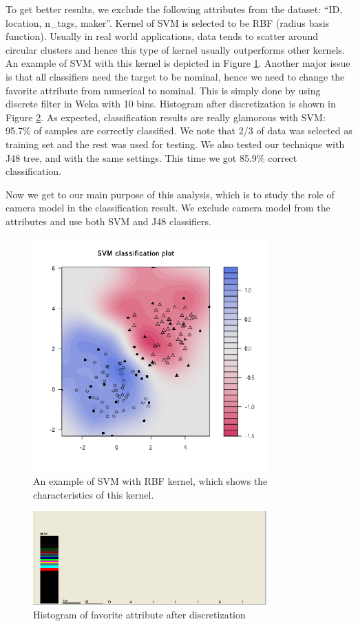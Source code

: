 \documentclass[letter,12pt]{article}
\begin{document}
To get better results, we exclude the following attributes from the
dataset: {}``ID, location, n\_tags, maker''. Kernel of SVM is selected
to be RBF (radius basis function). Usually in real world applications,
data tends to scatter around circular clusters and hence this type
of kernel usually outperforms other kernels. An example of SVM with
this kernel is depicted in Figure \ref{Flo:Rbf}. Another major issue
is that all classifiers need the target to be nominal, hence we need
to change the favorite attribute from numerical to nominal. This
is simply done by using discrete filter in Weka with 10 bins. Histogram
after discretization is shown in Figure \ref{Flo:disc}. As expected,
classification results are really glamorous with SVM: 95.7\% of samples
are correctly classified. We note that 2/3 of data was selected as
training set and the rest was used for testing. We also tested our
technique with J48 tree, and with the same settings. This time we
got 85.9\% correct classification.

Now we get to our main purpose of this analysis, which is to study
the role of camera model in the classification result. We exclude
camera model from the attributes and use both SVM and J48 classifiers.

%
\begin{figure}
\centering
\includegraphics[width=0.8\textwidth]{svm_rbf.png}
\caption{An example of SVM with RBF kernel, which shows the characteristics
of this kernel.}
\label{Flo:Rbf}
\end{figure}


%
\begin{figure}
\centering
\includegraphics[width=0.8\textwidth]{hist_disc.png}
\caption{Histogram of favorite attribute after discretization}
\label{Flo:disc}
\end{figure}
\end{document}
